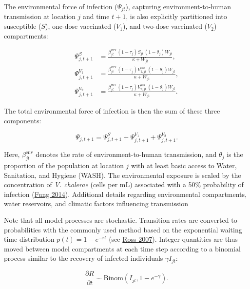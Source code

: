 \documentclass[
]{book}
\begin{document}
The environmental force of infection (\(\Psi_{jt}\)), capturing environment-to-human transmission at location \(j\) and time \(t+1\), is also explicitly partitioned into susceptible (\(S\)), one-dose vaccinated (\(V_1\)), and two-dose vaccinated (\(V_2\)) compartments:

\begin{equation}
\begin{aligned}
\Psi^S_{j,t+1} &= \frac{\beta_{jt}^{\text{env}}\, (1-\tau_{j})S_{jt}\,(1-\theta_j)W_{jt}}{\kappa + W_{jt}},\\[8pt]
\Psi^{V_1}_{j,t+1} &= \frac{\beta_{jt}^{\text{env}}\, (1-\tau_{j})V^{\text{sus}}_{1,jt}\,(1-\theta_j)W_{jt}}{\kappa + W_{jt}},\\[8pt]
\Psi^{V_2}_{j,t+1} &= \frac{\beta_{jt}^{\text{env}}\, (1-\tau_{j})V^{\text{sus}}_{2,jt}\,(1-\theta_j)W_{jt}}{\kappa + W_{jt}}.
\end{aligned}
\label{eq:foi-environment}
\end{equation}

The total environmental force of infection is then the sum of these three components:

\begin{equation}
\Psi_{j,t+1} = \Psi^S_{j,t+1} + \Psi^{V_1}_{j,t+1} + \Psi^{V_2}_{j,t+1}.
\label{eq:foi-environment-total}
\end{equation}

Here, \(\beta_{jt}^{\text{env}}\) denotes the rate of environment-to-human transmission, and \(\theta_j\) is the proportion of the population at location \(j\) with at least basic access to Water, Sanitation, and Hygiene (WASH). The environmental exposure is scaled by the concentration of \emph{V. cholerae} (cells per mL) associated with a 50\% probability of infection (\href{https://www.ncbi.nlm.nih.gov/pmc/articles/PMC3926264/}{Fung 2014}). Additional details regarding environmental compartments, water reservoirs, and climatic factors influencing transmission

Note that all model processes are stochastic. Transition rates are converted to probabilities with the commonly used method based on the exponential waiting time distribution \(p(t) = 1-e^{-rt}\) (see \href{https://www.google.com/books/edition/Introduction_to_Probability_Models/1uxBwhAb_zYC?hl=en}{Ross 2007}). Integer quantities are thus moved between model compartments at each time step according to a binomial process similar to the recovery of infected individuals \(\gamma I_{jt}\):

\begin{equation}
\frac{\partial R}{\partial t} \sim \text{Binom}(I_{jt}, 1-e^{-\gamma}).
\end{equation}
\end{document}
